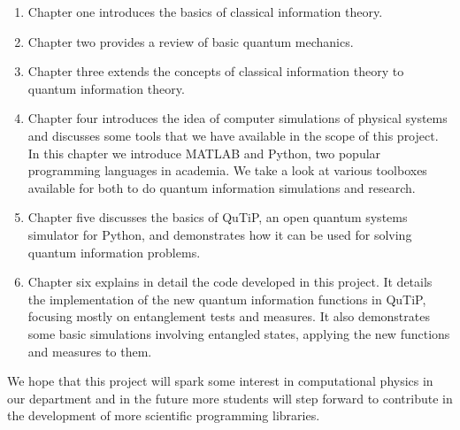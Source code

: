 \begin{enumerate}
  \item Chapter one introduces the basics of classical information theory.
  \item Chapter two provides a review of basic quantum mechanics.
  \item Chapter three extends the concepts of classical information theory to quantum information theory.
  \item Chapter four introduces the idea of computer simulations of physical systems and discusses some tools that we have available in the scope of this project. In this chapter we introduce MATLAB and Python, two popular programming languages in academia. We take a look at various toolboxes available for both to do quantum information simulations and research.
  \item Chapter five discusses the basics of QuTiP, an open quantum systems simulator for Python, and demonstrates how it can be used for solving quantum information problems.
  \item Chapter six explains in detail the code developed in this project. It details the implementation of the new quantum information functions in QuTiP, focusing mostly on entanglement tests and measures. It also demonstrates some basic simulations involving entangled states, applying the new functions and measures to them.
\end{enumerate}
We hope that this project will spark some interest in computational physics in our department and in the future more students will step forward to contribute in the development of more scientific programming libraries.

